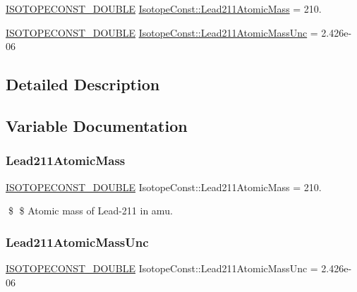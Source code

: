 \begin{DoxyCompactItemize}
\item 
\mbox{\hyperlink{group___isotope_const-_macros_ga8f45a7272ce02c0b4c65c44636ed719a}{I\+S\+O\+T\+O\+P\+E\+C\+O\+N\+S\+T\+\_\+\+D\+O\+U\+B\+LE}} \mbox{\hyperlink{group___isotope_const-_lead-_pb211_gabcfec2d34bba9c327a209a1f893ef194}{Isotope\+Const\+::\+Lead211\+Atomic\+Mass}} = 210.
\item 
\mbox{\hyperlink{group___isotope_const-_macros_ga8f45a7272ce02c0b4c65c44636ed719a}{I\+S\+O\+T\+O\+P\+E\+C\+O\+N\+S\+T\+\_\+\+D\+O\+U\+B\+LE}} \mbox{\hyperlink{group___isotope_const-_lead-_pb211_gaab7537eb8fb990b9a278a9c310e27e56}{Isotope\+Const\+::\+Lead211\+Atomic\+Mass\+Unc}} = 2.\+426e-\/06
\end{DoxyCompactItemize}


\subsection{Detailed Description}


\subsection{Variable Documentation}
\mbox{\label{group___isotope_const-_lead-_pb211_gabcfec2d34bba9c327a209a1f893ef194}} 
\subsubsection{\texorpdfstring{Lead211\+Atomic\+Mass}{Lead211AtomicMass}}
{\footnotesize\ttfamily \mbox{\hyperlink{group___isotope_const-_macros_ga8f45a7272ce02c0b4c65c44636ed719a}{I\+S\+O\+T\+O\+P\+E\+C\+O\+N\+S\+T\+\_\+\+D\+O\+U\+B\+LE}} Isotope\+Const\+::\+Lead211\+Atomic\+Mass = 210.}

\$ \$ Atomic mass of Lead-\/211 in amu. \mbox{\label{group___isotope_const-_lead-_pb211_gaab7537eb8fb990b9a278a9c310e27e56}} 
\subsubsection{\texorpdfstring{Lead211\+Atomic\+Mass\+Unc}{Lead211AtomicMassUnc}}
{\footnotesize\ttfamily \mbox{\hyperlink{group___isotope_const-_macros_ga8f45a7272ce02c0b4c65c44636ed719a}{I\+S\+O\+T\+O\+P\+E\+C\+O\+N\+S\+T\+\_\+\+D\+O\+U\+B\+LE}} Isotope\+Const\+::\+Lead211\+Atomic\+Mass\+Unc = 2.\+426e-\/06}


